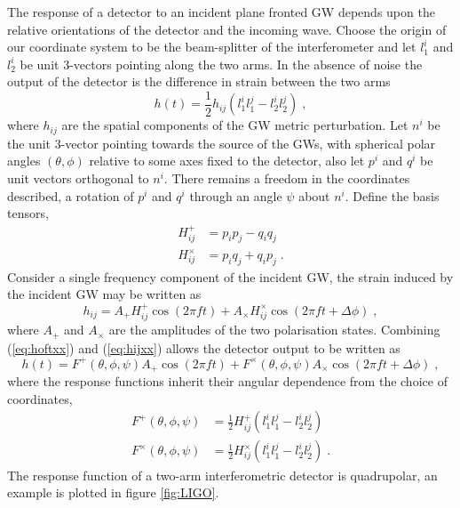 The response of a detector to an incident plane fronted GW depends upon the relative orientations of the detector and the incoming wave. Choose the origin of our coordinate system to be the beam-splitter of the interferometer and let $l_{1}^{i}$ and $l_{2}^{i}$ be unit 3-vectors pointing along the two arms. In the absence of noise the output of the detector is the difference in strain between the two arms \citep{MTW}
\begin{equation}\label{eq:hoftxx} h(t)=\frac{1}{2}h_{ij}\left( l_{1}^{i}l_{1}^{j}-l_{2}^{i}l_{2}^{j} \right)\; , \end{equation}
where $h_{ij}$ are the spatial components of the GW metric perturbation. Let $n^{i}$ be the unit 3-vector pointing towards the source of the GWs, with spherical polar angles $(\theta,\phi)$ relative to some axes fixed to the detector, also let $p^{i}$ and $q^{i}$ be unit vectors orthogonal to $n^{i}$. There remains a freedom in the coordinates described, a rotation of $p^{i}$ and $q^{i}$ through an angle $\psi$ about $n^{i}$. Define the basis tensors,
\begin{eqnarray}
H^{+}_{ij}&=p_{i}p_{j}-q_{i}q_{j} \nonumber \\
H^{\times}_{ij}&=p_{i}q_{j}+q_{i}p_{j} \; .
\end{eqnarray}
Consider a single frequency component of the incident GW, the strain induced by the incident GW may be written as
\begin{equation}\label{eq:hijxx} h_{ij}=A_{+}H^{+}_{ij}\cos\left(2\pi ft\right)+A_{\times}H^{\times}_{ij}\cos\left(2\pi ft+\Delta \phi\right) \; ,\end{equation}
where $A_{+}$ and $A_{\times}$ are the amplitudes of the two polarisation states. Combining (\ref{eq:hoftxx}) and (\ref{eq:hijxx}) allows the detector output to be written as
\begin{equation} h(t)=F^{+}(\theta,\phi,\psi)A_{+}\cos\left(2\pi ft\right)+F^{\times}(\theta,\phi,\psi)A_{\times}\cos\left(2\pi f t + \Delta\phi \right)\; , \end{equation}
where the response functions inherit their angular dependence from the choice of coordinates,
\begin{eqnarray}
F^{+}(\theta,\phi,\psi)&=\frac{1}{2}H^{+}_{ij}\left(l_{1}^{i}l_{1}^{j}-l_{2}^{i}l_{2}^{j}\right) \nonumber \\
F^{\times}(\theta,\phi,\psi)&=\frac{1}{2}H^{\times}_{ij}\left(l_{1}^{i}l_{1}^{j}-l_{2}^{i}l_{2}^{j}\right) \; . 
\end{eqnarray}
The response function of a two-arm interferometric detector is quadrupolar, an example is plotted in figure \ref{fig:LIGO}.


